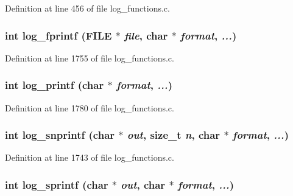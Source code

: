 Definition at line 456 of file log\_\-functions.c.
\subsubsection[{log\_\-fprintf}]{\setlength{\rightskip}{0pt plus 5cm}int log\_\-fprintf (FILE $\ast$ {\em file}, \/  char $\ast$ {\em format}, \/   {\em ...})}\label{log__functions_8c_3b87e5d817c164ef1dc8fee8974aaf5e}




Definition at line 1755 of file log\_\-functions.c.
\subsubsection[{log\_\-printf}]{\setlength{\rightskip}{0pt plus 5cm}int log\_\-printf (char $\ast$ {\em format}, \/   {\em ...})}\label{log__functions_8c_823f087c4428984fe6e8cb074c265179}




Definition at line 1780 of file log\_\-functions.c.
\subsubsection[{log\_\-snprintf}]{\setlength{\rightskip}{0pt plus 5cm}int log\_\-snprintf (char $\ast$ {\em out}, \/  size\_\-t {\em n}, \/  char $\ast$ {\em format}, \/   {\em ...})}\label{log__functions_8c_255a6aeacda1e202d9066e2da937c3e7}




Definition at line 1743 of file log\_\-functions.c.
\subsubsection[{log\_\-sprintf}]{\setlength{\rightskip}{0pt plus 5cm}int log\_\-sprintf (char $\ast$ {\em out}, \/  char $\ast$ {\em format}, \/   {\em ...})}\label{log__functions_8c_e80a4154d6af3dc122b1b8f1b398b616}





